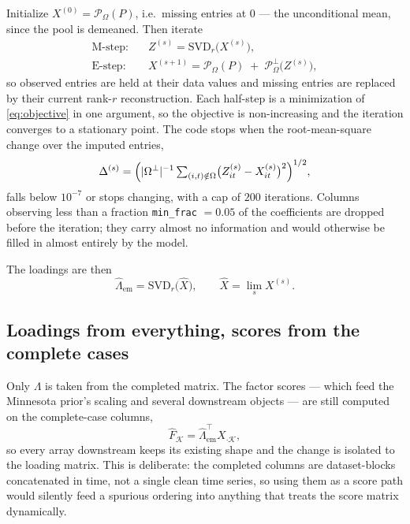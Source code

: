 \documentclass[11pt]{article}
\newcommand{\code}[1]{\texttt{#1}}
\newcommand{\SVD}{\mathrm{SVD}}
\begin{document}
Initialize $X^{(0)} = \mathcal{P}_\Omega(P)$, i.e.\ missing entries at $0$ ---
the unconditional mean, since the pool is demeaned. Then iterate
\begin{align}
  \text{M-step:}&\quad Z^{(s)} = \SVD_r\bigl( X^{(s)} \bigr), \label{eq:mstep}\\
  \text{E-step:}&\quad X^{(s+1)} = \mathcal{P}_\Omega(P) \;+\; \mathcal{P}_\Omega^{\perp}\bigl(Z^{(s)}\bigr),
  \label{eq:estep}
\end{align}
so observed entries are held at their data values and missing entries are
replaced by their current rank-$r$ reconstruction. Each half-step is a
minimization of \eqref{eq:objective} in one argument, so the objective is
non-increasing and the iteration converges to a stationary point. The code stops
when the root-mean-square change over the imputed entries,
\begin{equation}
  \Delta^{(s)} = \Bigl( |\Omega^{\perp}|^{-1} \textstyle\sum_{(i,t)\notin\Omega}
  \bigl(Z^{(s)}_{it} - X^{(s)}_{it}\bigr)^2 \Bigr)^{1/2},
\end{equation}
falls below $10^{-7}$ or stops changing, with a cap of $200$ iterations.
Columns observing less than a fraction \code{min\_frac} $= 0.05$ of the
coefficients are dropped before the iteration; they carry almost no information
and would otherwise be filled in almost entirely by the model.

The loadings are then
\begin{equation}
  \hat\Lambda_{\mathrm{em}} = \SVD_r\bigl( \hat X \bigr),
  \qquad \hat X = \lim_s X^{(s)} .
\end{equation}

\subsection{Loadings from everything, scores from the complete cases}

Only $\Lambda$ is taken from the completed matrix. The factor scores --- which
feed the Minnesota prior's scaling and several downstream objects --- are still
computed on the complete-case columns,
\begin{equation}
  \hat F_{\mathcal{K}} = \hat\Lambda_{\mathrm{em}}^{\top} X_{\cdot\mathcal{K}} ,
\end{equation}
so every array downstream keeps its existing shape and the change is isolated to
the loading matrix. This is deliberate: the completed columns are
dataset-blocks concatenated in time, not a single clean time series, so using
them as a score path would silently feed a spurious ordering into anything that
treats the score matrix dynamically.
\end{document}
